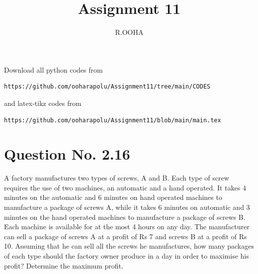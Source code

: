 \documentclass[journal,12pt,twocolumn]{IEEEtran}
\begin{document}
\makeatother
\let\StandardTheFigure\thefigure
\let\vec\mathbf
\renewcommand{\thefigure}{\theproblem}
\def\putbox#1#2#3{\makebox[0in][l]{\makebox[#1][l]{}\raisebox{\baselineskip}[0in][0in]{\raisebox{#2}[0in][0in]{#3}}}}
     \def\rightbox#1{\makebox[0in][r]{#1}}
     \def\centbox#1{\makebox[0in]{#1}}
     \def\topbox#1{\raisebox{-\baselineskip}[0in][0in]{#1}}
     \def\midbox#1{\raisebox{-0.5\baselineskip}[0in][0in]{#1}}
\vspace{3cm}
\title{Assignment 11}
\author{R.OOHA}
\maketitle
\newpage
\bigskip
\renewcommand{\thefigure}{\theenumi}
\renewcommand{\thetable}{\theenumi}
Download all python codes from 
\begin{lstlisting}
https://github.com/ooharapolu/Assignment11/tree/main/CODES
\end{lstlisting}
%
and latex-tikz codes from 
%
\begin{lstlisting}
https://github.com/ooharapolu/Assignment11/blob/main/main.tex
\end{lstlisting}
%
\section{Question No. 2.16}
 A factory manufactures two types of screws,
A and B. Each type of screw requires the use
of two machines, an automatic and a hand
operated. It takes 4 minutes on the automatic
and 6 minutes on hand operated machines to
manufacture a package of screws A, while it
takes 6 minutes on automatic and 3 minutes
on the hand operated machines to manufacture
a package of screws B. Each machine is
available for at the most 4 hours on any day.
The manufacturer can sell a package of screws
A at a profit of Rs 7 and screws B at a profit
of Rs 10. Assuming that he can sell all the
screws he manufactures, how many packages
of each type should the factory owner produce
in a day in order to maximise his profit?
Determine the maximum profit.
%
\end{document}
